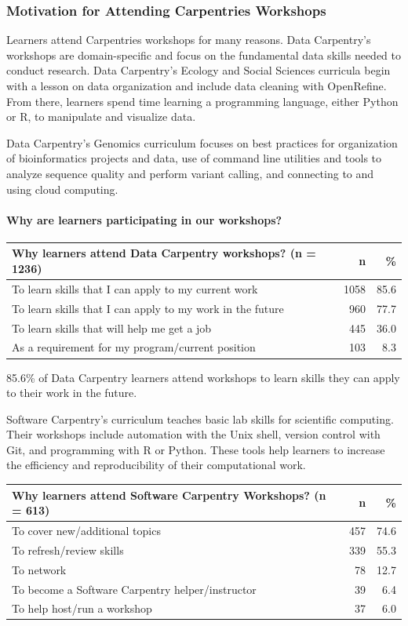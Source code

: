\documentclass[]{article}
\let\oldparagraph\paragraph
\renewcommand{\paragraph}[1]{\oldparagraph{#1}\mbox{}}
\begin{document}
\subsubsection{Motivation for Attending Carpentries
Workshops}\label{motivation-for-attending-carpentries-workshops}

Learners attend Carpentries workshops for many reasons. Data Carpentry's
workshops are domain-specific and focus on the fundamental data skills
needed to conduct research. Data Carpentry's Ecology and Social Sciences
curricula begin with a lesson on data organization and include data
cleaning with OpenRefine. From there, learners spend time learning a
programming language, either Python or R, to manipulate and visualize
data.

Data Carpentry's Genomics curriculum focuses on best practices for
organization of bioinformatics projects and data, use of command line
utilities and tools to analyze sequence quality and perform variant
calling, and connecting to and using cloud computing.

\paragraph{Why are learners participating in our
workshops?}\label{why-are-learners-participating-in-our-workshops}

\begin{longtable}[]{@{}lrr@{}}
\toprule
Why learners attend Data Carpentry workshops? (n = 1236) & n &
\%\tabularnewline
\midrule
\endhead
To learn skills that I can apply to my current work & 1058 &
85.6\tabularnewline
To learn skills that I can apply to my work in the future & 960 &
77.7\tabularnewline
To learn skills that will help me get a job & 445 & 36.0\tabularnewline
As a requirement for my program/current position & 103 &
8.3\tabularnewline
\bottomrule
\end{longtable}

85.6\% of Data Carpentry learners attend workshops to learn skills they
can apply to their work in the future.

Software Carpentry's curriculum teaches basic lab skills for scientific
computing. Their workshops include automation with the Unix shell,
version control with Git, and programming with R or Python. These tools
help learners to increase the efficiency and reproducibility of their
computational work.

\begin{longtable}[]{@{}lrr@{}}
\toprule
Why learners attend Software Carpentry Workshops? (n = 613) & n &
\%\tabularnewline
\midrule
\endhead
To cover new/additional topics & 457 & 74.6\tabularnewline
To refresh/review skills & 339 & 55.3\tabularnewline
To network & 78 & 12.7\tabularnewline
To become a Software Carpentry helper/instructor & 39 &
6.4\tabularnewline
To help host/run a workshop & 37 & 6.0\tabularnewline
\bottomrule
\end{longtable}
\end{document}
